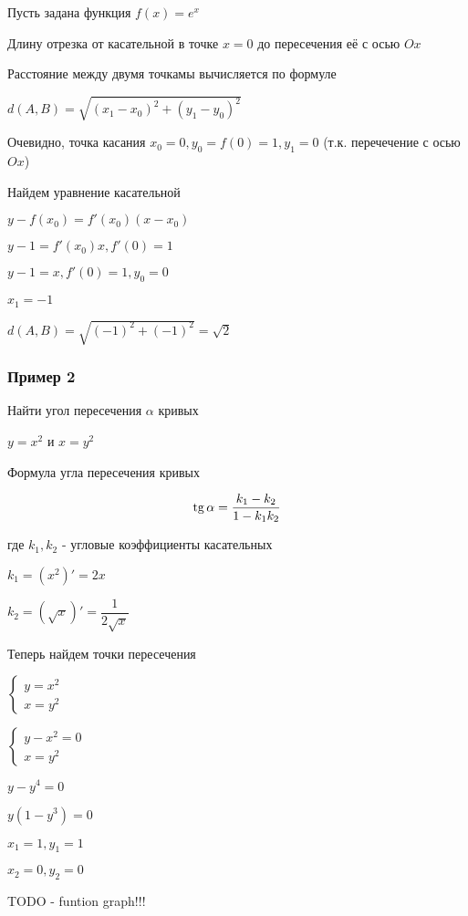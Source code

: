 Пусть задана функция $ f(x) = e^{x} $

Длину отрезка от касательной в точке $ x = 0 $ до пересечения её с осью $ Ox $

Расстояние между двумя точкамы вычисляется по формуле

$ d(A,B) = \sqrt{(x_{1} - x_{0})^{2} + (y_{1} - y_{0})^{2}} $

Очевидно, точка касания $ x_0 = 0, y_0 = f(0) = 1, y_1 = 0 $ (т.к. перечечение с осью $ Ox $)

Найдем уравнение касательной

$ y - f(x_0) = f'(x_0)(x - x_0) $

$ y - 1 = f'(x_0)x, f'(0) = 1 $

$ y - 1 = x, f'(0) = 1, y_0 = 0 $

$ x_1 = -1 $

$ d(A,B) = \sqrt{(-1)^{2} + (-1)^{2}} = \sqrt{2}$

\subsubsection{Пример 2}

Найти угол пересечения $ \alpha $ кривых

$ y = x^{2} $ и $ x = y^{2} $

Формула угла пересечения кривых

$$
\operatorname{tg} \alpha = \dfrac{k_{1} - k_{2}}{1 - k_{1}k_{2}} \label{functions_angle}
$$

где $ k_1, k_2 $ - угловые коэффициенты касательных

$ k_1 = (x^{2})' = 2x $

$ k_2 = (\sqrt{x})' = \dfrac{1}{2 \sqrt{x}} $

Теперь найдем точки пересечения


$\begin{cases}
 y = x^{2} \\
 x = y^{2}
\end{cases}$

$\begin{cases}
 y - x^{2} = 0 \\
 x = y^{2}
\end{cases}$

$ y - y^{4} = 0 $

$ y(1 - y^{3}) = 0 $

$ x_1 = 1, y_1 = 1 $

$ x_2 = 0, y_2 = 0 $

TODO - funtion graph!!!

